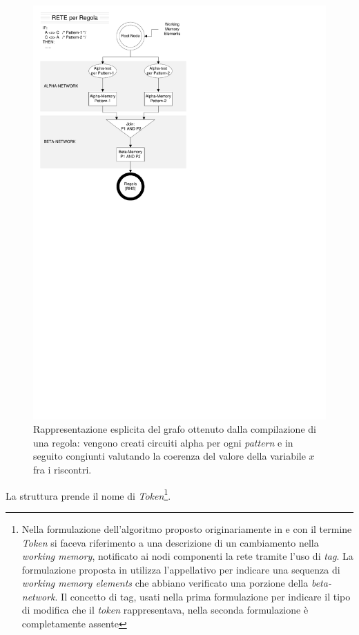 \begin{figure}
\centering
\includegraphics[viewport=14 446 312 829]{Immagini/Capitolo1/RETE-regola.pdf}
\caption[Grafo esplicito di RETE per una regola]{Rappresentazione esplicita del grafo ottenuto dalla compilazione di una regola: vengono creati circuiti alpha per ogni \emph{pattern} e in seguito congiunti valutando la coerenza del valore della variabile $x$ fra i riscontri.}\label{fig:grafo-regola}
\end{figure}


La struttura prende il nome di \emph{Token}\footnote{Nella formulazione dell'algoritmo proposto originariamente in \cite{forgy1979} e \cite{forgy1982} con il termine \emph{Token} si faceva riferimento a una descrizione di un cambiamento nella \emph{working memory}, notificato ai nodi componenti la rete tramite l'uso di \emph{tag}. La formulazione proposta in \cite{Doorenbos95productionmatching} utilizza l'appellativo per indicare una sequenza di \emph{working memory elements} che abbiano verificato una porzione della \emph{beta-network}. Il concetto di tag, usati nella prima formulazione per indicare il tipo di modifica che il \emph{token} rappresentava, nella seconda formulazione è completamente assente}.

